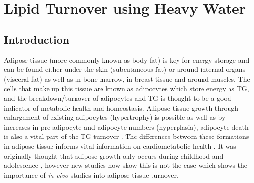 \chapter{Lipid Turnover using Heavy Water}
\label{Chap:Lipid}

\section{Introduction}

Adipose tissue (more commonly known as body fat) is key for energy storage and can be found either under the skin (subcutaneous fat) or around internal organs (visceral fat) as well as in bone marrow, in breast tissue and around muscles. The cells that make up this tissue are known as adipocytes which store energy as \ac{TG}, and the breakdown/turnover of adipocytes and \ac{TG} is thought to be a good indicator of metabolic health and homeostasis. Adipose tissue growth through enlargement of existing adipocytes (hypertrophy) is possible as well as by increases in pre-adipocyte and adipocyte numbers (hyperplasia), adipocyte death is also a vital part of the \ac{TG} turnover \cite{White2019DynamicsDisease}. The differences between these formations in adipose tissue informs vital information on cardiometabolic health \cite{Carnethon2002Serum19871998}. It was originally thought that adipose growth only occurs during childhood and adolescence \cite{Salans1973StudiesPatients}, however new studies now show this is not the case \cite{White2016DifferencesWomen} which shows the importance of \textit{in vivo} studies into adipose tissue turnover.


